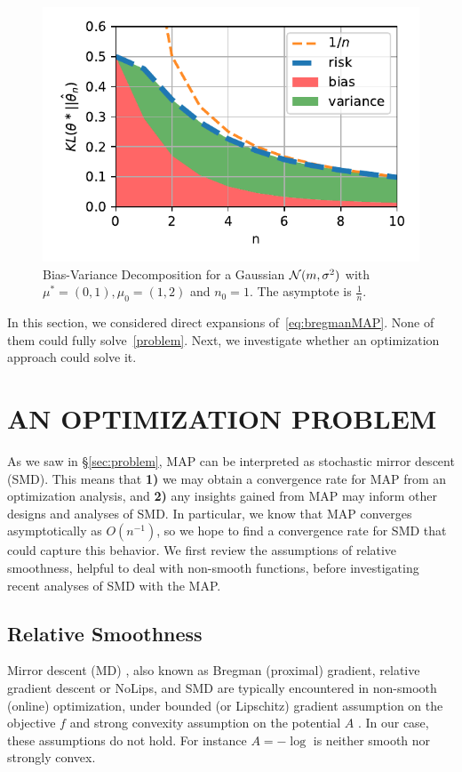 \documentclass[twoside]{article}
\newcommand{\logpart}{A}
\newcommand{\m}{\mu}
\newcommand{\meanp}{\m}
\begin{document}
\begin{figure}[t]
	\centering
	\includegraphics[width=.4\textwidth]{figs/gaussians/new_linear_n0=1.pdf}
	\caption{
	Bias-Variance Decomposition for a Gaussian ${\mathcal N}(m, \sigma^2)$ with $\meanp^*=(0, 1), \meanp_0 = (1,2)$ and $n_0=1$. The asymptote is $\frac{1}{n}$.
	}
	\label{fig:gaussian_decomposition}
\end{figure}

In this section, we considered direct expansions of~\eqref{eq:bregmanMAP}.
None of them could fully solve~\eqref{problem}.
Next, we investigate whether an optimization approach could solve it.


\section{AN OPTIMIZATION PROBLEM}
\label{sec:optimization}


As we saw in \S\ref{sec:problem}, MAP  can be interpreted as stochastic mirror descent (SMD).
This means that \textbf{1)} we may obtain a convergence rate for MAP from an optimization analysis, and \textbf{2)} any insights gained from MAP may inform other designs and analyses of SMD.
In particular, we know that MAP converges asymptotically as $O(n^{-1})$, so we hope to find a convergence rate for SMD that could capture this behavior. 
We first review the assumptions of relative smoothness, helpful to deal with non-smooth functions, before investigating recent analyses of SMD with the MAP.

\subsection{Relative Smoothness}
Mirror descent (MD) \citep{nemirovski1983problem,beck2003mirror}, also known as
Bregman (proximal) gradient, relative gradient descent or NoLips,
and SMD \citep{nemirovski2009robust,ghadimi2012optimal}
are typically encountered in non-smooth (online) optimization,
under bounded (or Lipschitz) gradient assumption on the objective $f$
and strong convexity assumption on the potential $\logpart$
\citep[Th. 4.2(MD) \& Th. 6.3(SMD)]{bubeck2015convex}.
In our case, these assumptions do not hold.
For instance $\logpart = -\log$ is neither smooth nor strongly convex.
\end{document}
